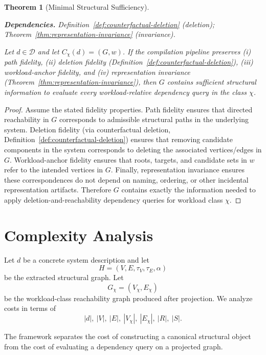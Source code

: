 \documentclass[11pt]{article}
\newtheorem{theorem}{Theorem}
\newcommand{\deps}[1]{\par\noindent\textbf{Dependencies.} #1\par}
\begin{document}
\begin{theorem}[Minimal Structural Sufficiency]
\label{thm:minimal-structural-sufficiency}
\deps{Definition~\ref{def:counterfactual-deletion} (deletion); Theorem~\ref{thm:representation-invariance} (invariance).}
Let $d\in\mathcal D$ and let $C_\chi(d)=(G,w)$.
If the compilation pipeline preserves (i) path fidelity, (ii) deletion fidelity (Definition~\ref{def:counterfactual-deletion}), (iii) workload-anchor fidelity, and (iv) representation invariance (Theorem~\ref{thm:representation-invariance}),
then $G$ contains sufficient structural information to evaluate every workload-relative dependency query in the class $\chi$.
\end{theorem}
\begin{proof}
Assume the stated fidelity properties.
Path fidelity ensures that directed reachability in $G$ corresponds to admissible structural paths in the underlying system.
Deletion fidelity (via counterfactual deletion, Definition~\ref{def:counterfactual-deletion}) ensures that removing candidate components in the system corresponds to deleting the associated vertices/edges in $G$.
Workload-anchor fidelity ensures that roots, targets, and candidate sets in $w$ refer to the intended vertices in $G$.
Finally, representation invariance ensures these correspondences do not depend on naming, ordering, or other incidental representation artifacts.
Therefore $G$ contains exactly the information needed to apply deletion-and-reachability dependency queries for workload class $\chi$.
\end{proof}

\section{Complexity Analysis}
\label{sec:complexity}

Let $d$ be a concrete system description and let
\[
H=(V,E,\tau_V,\tau_E,\alpha)
\]
be the extracted structural graph. Let
\[
G_\chi=(V_\chi,E_\chi)
\]
be the workload-class reachability graph produced after projection. We analyze costs in terms of
\[
|d|,\ |V|,\ |E|,\ |V_\chi|,\ |E_\chi|,\ |R|,\ |S|.
\]

The framework separates the cost of constructing a canonical structural object from the cost of evaluating a dependency query on a projected graph.
\end{document}
